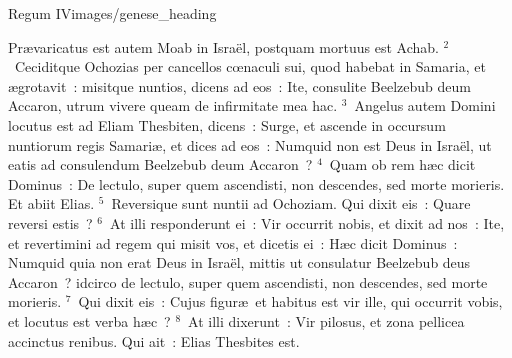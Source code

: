 {Regum IV}{images/genese_heading}


\bchapter
\lettrine[lines=6,image=true,loversize=0.05,lraise=-0.03]{P}{}r\ae varicatus est autem Moab in Isra\"el, postquam mortuus est Achab.
${}^{2}$~Ceciditque Ochozias per cancellos cœnaculi sui, quod habebat in Samaria, et \ae grotavit~: misitque nuntios, dicens ad eos~: Ite, consulite Beelzebub deum Accaron, utrum vivere queam de infirmitate mea hac.
${}^{3}$~Angelus autem Domini locutus est ad Eliam Thesbiten, dicens~: Surge, et ascende in occursum nuntiorum regis Samari\ae , et dices ad eos~: Numquid non est Deus in Isra\"el, ut eatis ad consulendum Beelzebub deum Accaron~?
${}^{4}$~Quam ob rem h\ae c dicit Dominus~: De lectulo, super quem ascendisti, non descendes, sed morte morieris. Et abiit Elias.
${}^{5}$~Reversique sunt nuntii ad Ochoziam. Qui dixit eis~: Quare reversi estis~?
${}^{6}$~At illi responderunt ei~: Vir occurrit nobis, et dixit ad nos~: Ite, et revertimini ad regem qui misit vos, et dicetis ei~: H\ae c dicit Dominus~: Numquid quia non erat Deus in Isra\"el, mittis ut consulatur Beelzebub deus Accaron~? idcirco de lectulo, super quem ascendisti, non descendes, sed morte morieris.
${}^{7}$~Qui dixit eis~: Cujus figur\ae\ et habitus est vir ille, qui occurrit vobis, et locutus est verba h\ae c~?
${}^{8}$~At illi dixerunt~: Vir pilosus, et zona pellicea accinctus renibus. Qui ait~: Elias Thesbites est.



